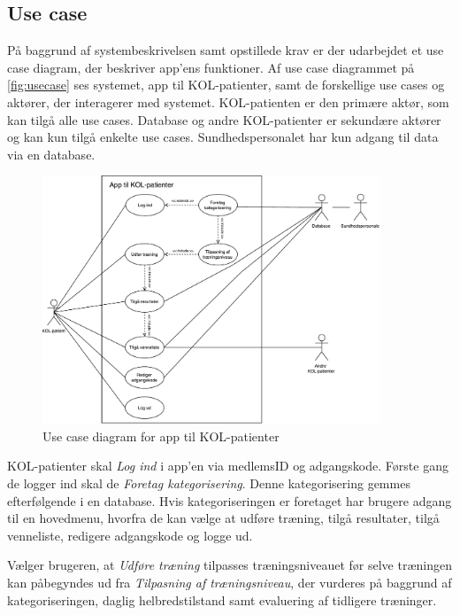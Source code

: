 \subsection{Use case} \label{sec:usecase} 
På baggrund af systembeskrivelsen samt opstillede krav er der udarbejdet et use case diagram, der beskriver app'ens funktioner. Af use case diagrammet på \autoref{fig:usecase} ses systemet, app til KOL-patienter, samt de forskellige use cases og aktører, der interagerer med systemet. KOL-patienten er den primære aktør, som kan tilgå alle use cases.  Database og andre KOL-patienter er sekundære aktører og kan kun tilgå enkelte use cases. Sundhedspersonalet har kun adgang til data via en database. 

\begin{figure} [H]
\centering
\includegraphics[width=0.9\textwidth]{figures/aktivitetsdiagram/Usecase}
\caption{Use case diagram for app til KOL-patienter}
\label{fig:usecase}
\end{figure}

\noindent
KOL-patienter skal \textit{Log ind} i app'en via medlemsID og adgangskode. Første gang de logger ind skal de \textit{Foretag kategorisering}. Denne kategorisering gemmes efterfølgende i en database.
Hvis kategoriseringen er foretaget har brugere adgang til en hovedmenu, hvorfra de kan vælge at udføre træning, tilgå resultater, tilgå venneliste, redigere adgangskode og logge ud. 

Vælger brugeren, at \textit{Udføre træning} tilpasses træningsniveauet før selve træningen kan påbegyndes ud fra \textit{Tilpasning af træningsniveau}, der vurderes på baggrund af kategoriseringen, daglig helbredstilstand samt evaluering af tidligere træninger. 

